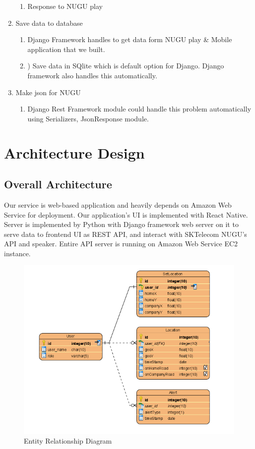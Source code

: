 \documentclass[conference]{IEEEtran}
\begin{document}
\begin{enumerate}
\begin{enumerate}
        \item Response to NUGU play\\
    \end{enumerate}
    
    \item Save data to database
    \begin{enumerate}
        \item Django Framework handles to get data form NUGU play & Mobile application that we built.
        \item ) Save data in SQlite which is default option for Django. Django framework also handles this automatically.\\
    \end{enumerate}
    \item Make json for NUGU
    \begin{enumerate}
        \item Django Rest Framework module could handle this problem automatically using Serializers, JsonResponse module.\\
    \end{enumerate}
\end{enumerate}

\section{Architecture Design}
\subsection{Overall Architecture}
Our service is web-based application and heavily depends on Amazon Web Service for deployment. Our application’s UI is implemented with React Native. Server is implemented by Python with Django framework web server on it to serve data to frontend UI as REST API, and interact with SKTelecom NUGU’s API and speaker. Entire API server is running on Amazon Web Service EC2 instance.
\begin{figure}
    \centering
    \includegraphics{images/f6.png}
    \caption{Entity Relationship Diagram}
\end{figure}
\end{document}
